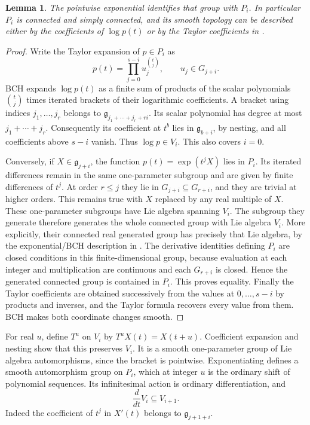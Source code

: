 \documentclass[11pt]{article}
\newtheorem{lemma}[theorem]{Lemma}
\newcommand{\fg}{\mathfrak g}
\begin{document}
\begin{lemma}\label{lem:Pi}
The pointwise exponential identifies that group with $P_i$. In particular
$P_i$ is connected and simply connected, and its smooth topology can be
described either by the coefficients of $\log p(t)$ or by the Taylor
coefficients in \cite[Lemma B.9]{GTZ}.
\end{lemma}
\begin{proof}
Write the Taylor expansion of $p\in P_i$ as
\[
 p(t)=\prod_{j=0}^{s-i} u_j^{\binom tj},\qquad u_j\in G_{j+i}.
\]
BCH expands $\log p(t)$ as a finite sum of products of the scalar
polynomials $\binom tj$ times iterated brackets of their logarithmic
coefficients. A bracket using indices $j_1,\ldots,j_r$ belongs to
$\fg_{j_1+\cdots+j_r+ri}$. Its scalar polynomial has degree at most
$j_1+\cdots+j_r$. Consequently its coefficient at $t^b$ lies in
$\fg_{b+i}$, by nesting, and all coefficients above $s-i$ vanish.
Thus $\log p\in V_i$. This also covers $i=0$.

Conversely, if $X\in\fg_{j+i}$, the function
$p(t)=\exp(t^j X)$ lies in $P_i$. Its iterated differences remain in the
same one-parameter subgroup and are given by finite differences of $t^j$.
At order $r\leq j$ they lie in $G_{j+i}\subseteq G_{r+i}$, and they are
trivial at higher orders. This remains true with $X$ replaced by any real
multiple of $X$. These one-parameter subgroups have Lie algebra spanning
$V_i$. The subgroup they generate therefore generates the whole connected
group with Lie algebra $V_i$. More explicitly, their connected real
generated group has precisely that Lie algebra, by the exponential/BCH
description in \cite[Section 3]{GTZ}. The derivative identities defining
$P_i$ are closed conditions in this finite-dimensional group, because
evaluation at each integer and multiplication are continuous and each
$G_{r+i}$ is closed. Hence the generated connected group is contained in
$P_i$. This proves equality. Finally the Taylor coefficients are obtained
successively from the values at $0,\ldots,s-i$ by products and inverses,
and the Taylor formula recovers every value from them. BCH makes both
coordinate changes smooth.
\end{proof}

For real $u$, define $T^u$ on $V_i$ by $T^uX(t)=X(t+u)$.
Coefficient expansion and nesting show that this preserves $V_i$.
It is a smooth one-parameter group of Lie algebra automorphisms, since
the bracket is pointwise. Exponentiating defines a smooth automorphism
group on $P_i$, which at integer $u$ is the ordinary shift of polynomial
sequences. Its infinitesimal action is ordinary differentiation, and
\begin{equation}\label{eq:derivative}
 \frac{d}{dt}V_i\subseteq V_{i+1}.
\end{equation}
Indeed the coefficient of $t^j$ in $X'(t)$ belongs to
$\fg_{j+1+i}$.
\end{document}
